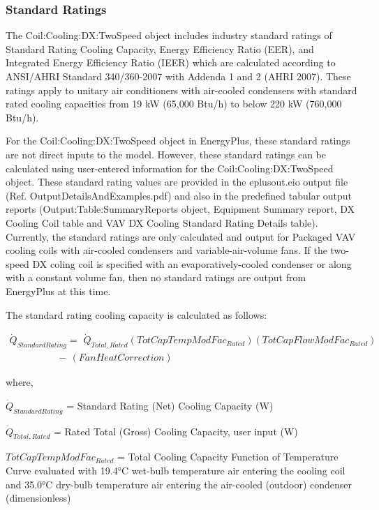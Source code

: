 \subsubsection{Standard Ratings}\label{standard-ratings}

The Coil:Cooling:DX:TwoSpeed object includes industry standard ratings of Standard Rating Cooling Capacity, Energy Efficiency Ratio (EER), and Integrated Energy Efficiency Ratio (IEER) which are calculated according to ANSI/AHRI Standard 340/360-2007 with Addenda 1 and 2 (AHRI 2007). These ratings apply to unitary air conditioners with air-cooled condensers with standard rated cooling capacities from 19 kW (65,000 Btu/h) to below 220 kW (760,000 Btu/h).

For the Coil:Cooling:DX:TwoSpeed object in EnergyPlus, these standard ratings are not direct inputs to the model. However, these standard ratings can be calculated using user-entered information for the Coil:Cooling:DX:TwoSpeed object. These standard rating values are provided in the eplusout.eio output file (Ref. OutputDetailsAndExamples.pdf) and also in the predefined tabular output reports (Output:Table:SummaryReports object, Equipment Summary report, DX Cooling Coil table and VAV DX Cooling Standard Rating Details table). Currently, the standard ratings are only calculated and output for Packaged VAV cooling coils with air-cooled condensers and variable-air-volume fans. If the two-speed DX coling coil is specified with an evaporatively-cooled condenser or along with a constant volume fan, then no standard ratings are output from EnergyPlus at this time.

The standard rating cooling capacity is calculated as follows:

\begin{equation}
\begin{array}{l}
{\dot Q}_{StandardRating} = \,\,{\dot Q}_{Total,Rated} \left( TotCapTempModFac_{Rated} \right) \left( TotCapFlowModFac_{Rated} \right) \\
\,\,\,\,\,\,\,\,\,\,\,\,\,\,\,\,\,\,\,\,\,\,\,\,\,\,\,\,\, - \,\left( FanHeatCorrection \right)
\end{array}
\end{equation}

where,

\({\dot Q_{StandardRating}}\) = Standard Rating (Net) Cooling Capacity (W)

\({\dot Q_{Total,Rated}}\) = Rated Total (Gross) Cooling Capacity, user input (W)

\(TotCapTempModFa{c_{Rated}}\) = Total Cooling Capacity Function of Temperature Curve evaluated with 19.4°C wet-bulb temperature air entering the cooling coil and 35.0°C dry-bulb temperature air entering the air-cooled (outdoor) condenser (dimensionless)

